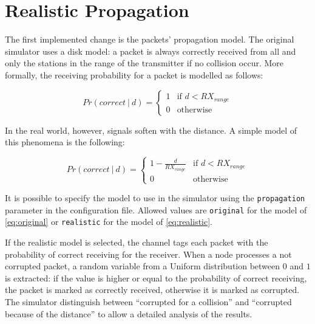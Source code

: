 \section{Realistic Propagation}
\label{sec:realistic_propagation}

The first implemented change is the packets' propagation model.
The original simulator uses a disk model: a packet is always correctly received from all and only the stations in the range of the transmitter if no collision occur.
More formally, the receiving probability for a packet is modelled as follows:

\begin{equation}
Pr(correct\ |\ d) =
    \left\{
    	\begin{array}{ll}
    		1 & \mbox{if } d < RX_{range} \\
    		0 & \mbox{otherwise}
    	\end{array}
    \right.
    \label{eq:original}
\end{equation}

In the real world, however, signals soften with the distance.
A simple model of this phenomena is the following:

\begin{equation}
Pr(correct\ |\ d) =
    \left\{
    	\begin{array}{ll}
    		1 - \frac{d}{RX_{range}} & \mbox{if } d < RX_{range} \\
    		0 & \mbox{otherwise}
    	\end{array}
    \right.
    \label{eq:realistic}
\end{equation}

It is possible to specify the model to use in the simulator using the \texttt{propagation} parameter in the configuration file.
Allowed values are \texttt{original} for the model of \cref{eq:original} or \texttt{realistic} for the model of \cref{eq:realistic}.

If the realistic model is selected, the channel tags each packet with the probability of correct receiving for the receiver.
When a node processes a not corrupted packet, a random variable from a Uniform distribution between $0$ and $1$ is extracted: if the value is higher or equal to the probability of correct receiving, the packet is marked as correctly received, otherwise it is marked as corrupted.
The simulator distinguish between ``corrupted for a collision'' and ``corrupted because of the distance'' to allow a detailed analysis of the results.
